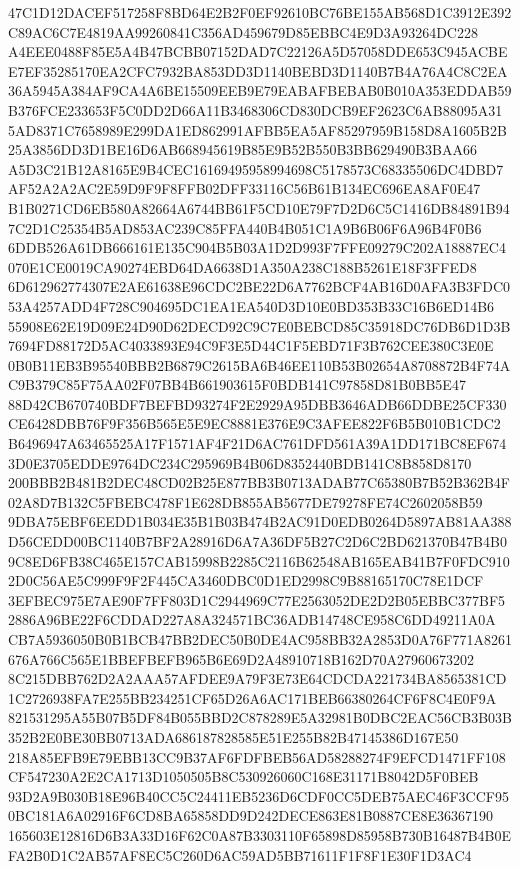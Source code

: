 \documentclass[UTF8,fontset=fandol,zihao=-4,a4paper]{ctexart}
\begin{document}
{{47C1D12DACEF517258F8BD64E2B2F0EF92610BC76BE155AB568D1C3912E392C89AC6C7E4819AA99260841C356AD459679D85EBBC4E9D3A93264DC228
A4EEE0488F85E5A4B47BCBB07152DAD7C22126A5D57058DDE653C945ACBEE7EF35285170EA2CFC7932BA853DD3D1140BEBD3D1140B7B4A76A4C8C2EA
36A5945A384AF9CA4A6BE15509EEB9E79EABAFBEBAB0B010A353EDDAB59B376FCE233653F5C0DD2D66A11B3468306CD830DCB9EF2623C6AB88095A31
5AD8371C7658989E299DA1ED862991AFBB5EA5AF85297959B158D8A1605B2B25A3856DD3D1BE16D6AB668945619B85E9B52B550B3BB629490B3BAA66
A5D3C21B12A8165E9B4CEC16169495958994698C5178573C68335506DC4DBD7AF52A2A2AC2E59D9F9F8FFB02DFF33116C56B61B134EC696EA8AF0E47
B1B0271CD6EB580A82664A6744BB61F5CD10E79F7D2D6C5C1416DB84891B947C2D1C25354B5AD853AC239C85FFA440B4B051C1A9B6B06F6A96B4F0B6
6DDB526A61DB666161E135C904B5B03A1D2D993F7FFE09279C202A18887EC4070E1CE0019CA90274EBD64DA6638D1A350A238C188B5261E18F3FFED8
6D612962774307E2AE61638E96CDC2BE22D6A7762BCF4AB16D0AFA3B3FDC053A4257ADD4F728C904695DC1EA1EA540D3D10E0BD353B33C16B6ED14B6
55908E62E19D09E24D90D62DECD92C9C7E0BEBCD85C35918DC76DB6D1D3B7694FD88172D5AC4033893E94C9F3E5D44C1F5EBD71F3B762CEE380C3E0E
0B0B11EB3B95540BBB2B6879C2615BA6B46EE110B53B02654A8708872B4F74AC9B379C85F75AA02F07BB4B661903615F0BDB141C97858D81B0BB5E47
88D42CB670740BDF7BEFBD93274F2E2929A95DBB3646ADB66DDBE25CF330CE6428DBB76F9F356B565E5E9EC8881E376E9C3AFEE822F6B5B010B1CDC2
B6496947A63465525A17F1571AF4F21D6AC761DFD561A39A1DD171BC8EF6743D0E3705EDDE9764DC234C295969B4B06D8352440BDB141C8B858D8170
200BBB2B481B2DEC48CD02B25E877BB3B0713ADAB77C65380B7B52B362B4F02A8D7B132C5FBEBC478F1E628DB855AB5677DE79278FE74C2602058B59
9DBA75EBF6EEDD1B034E35B1B03B474B2AC91D0EDB0264D5897AB81AA388D56CEDD00BC1140B7BF2A28916D6A7A36DF5B27C2D6C2BD621370B47B4B0
9C8ED6FB38C465E157CAB15998B2285C2116B62548AB165EAB41B7F0FDC9102D0C56AE5C999F9F2F445CA3460DBC0D1ED2998C9B88165170C78E1DCF
3EFBEC975E7AE90F7FF803D1C2944969C77E2563052DE2D2B05EBBC377BF52886A96BE22F6CDDAD227A8A324571BC36ADB14748CE958C6DD49211A0A
CB7A5936050B0B1BCB47BB2DEC50B0DE4AC958BB32A2853D0A76F771A8261676A766C565E1BBEFBEFB965B6E69D2A48910718B162D70A27960673202
8C215DBB762D2A2AAA57AFDEE9A79F3E73E64CDCDA221734BA8565381CD1C2726938FA7E255BB234251CF65D26A6AC171BEB66380264CF6F8C4E0F9A
821531295A55B07B5DF84B055BBD2C878289E5A32981B0DBC2EAC56CB3B03B352B2E0BE30BB0713ADA686187828585E51E255B82B47145386D167E50
218A85EFB9E79EBB13CC9B37AF6FDFBEB56AD58288274F9EFCD1471FF108CF547230A2E2CA1713D1050505B8C530926060C168E31171B8042D5F0BEB
93D2A9B030B18E96B40CC5C24411EB5236D6CDF0CC5DEB75AEC46F3CCF950BC181A6A02916F6CD8BA65858DD9D242DECE863E81B0887CE8E36367190
165603E12816D6B3A33D16F62C0A87B3303110F65898D85958B730B16487B4B0EFA2B0D1C2AB57AF8EC5C260D6AC59AD5BB71611F1F8F1E30F1D3AC4
}}
\end{document}
